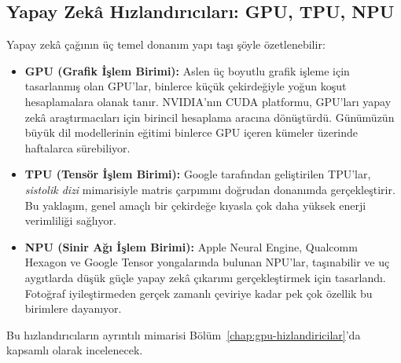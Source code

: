 \subsection{Yapay Zekâ Hızlandırıcıları: GPU, TPU, NPU}
\label{sec:yz-hizlandiricilar-giris}

Yapay zekâ çağının üç temel donanım yapı taşı şöyle özetlenebilir:

\begin{itemize}
    \item \textbf{GPU (Grafik İşlem Birimi):} Aslen üç boyutlu grafik işleme için tasarlanmış olan GPU'lar, binlerce küçük çekirdeğiyle yoğun koşut hesaplamalara olanak tanır. NVIDIA'nın CUDA platformu, GPU'ları yapay zekâ araştırmacıları için birincil hesaplama aracına dönüştürdü. Günümüzün büyük dil modellerinin eğitimi binlerce GPU içeren kümeler üzerinde haftalarca sürebiliyor.

    \item \textbf{TPU (Tensör İşlem Birimi):} Google tarafından geliştirilen TPU'lar, \emph{sistolik dizi} mimarisiyle matris çarpımını doğrudan donanımda gerçekleştirir. Bu yaklaşım, genel amaçlı bir çekirdeğe kıyasla çok daha yüksek enerji verimliliği sağlıyor.

    \item \textbf{NPU (Sinir Ağı İşlem Birimi):} Apple Neural Engine, Qualcomm Hexagon ve Google Tensor yongalarında bulunan NPU'lar, taşınabilir ve uç aygıtlarda düşük güçle yapay zekâ çıkarımı gerçekleştirmek için tasarlandı. Fotoğraf iyileştirmeden gerçek zamanlı çeviriye kadar pek çok özellik bu birimlere dayanıyor.
\end{itemize}
Bu hızlandırıcıların ayrıntılı mimarisi Bölüm~\ref{chap:gpu-hizlandiricilar}'da kapsamlı olarak incelenecek.

